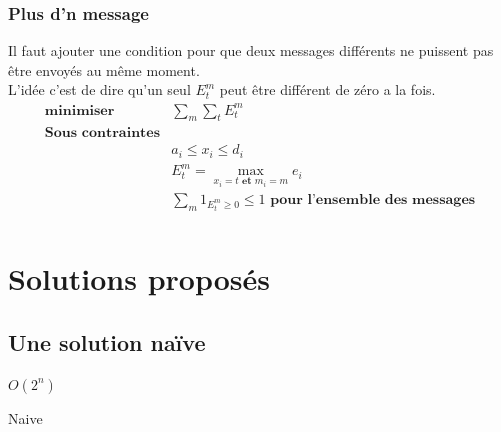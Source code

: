 \documentclass[runningheads]{llncs}
\begin{document}
\subsubsection{Plus d'n message}
Il faut ajouter une condition pour que deux messages différents ne puissent pas être envoy\'es au même moment.\\
L'idée c'est de dire qu'un seul $E_t^m$ peut être différent de zéro a la fois.
\[
    \begin{array}{cc}
         \textbf{minimiser} &  \sum \limits_{m}\sum\limits_{t} E_t^m\\
         \textbf{Sous contraintes} & \\
         & a_i \leq x_i \leq d_i\\
         & E_t^m = \max\limits_{x_i=t \textbf{ et } m_i=m} e_i \\
         & \sum\limits_{m}  1_{ E_t^m\geq 0} \leq 1 \textbf{ pour l'ensemble des messages} \\
    \end{array}
\]

\section{Solutions propos\'es }
\subsection{Une solution na\"ive }
$O(2^n)$ 
\begin{algorithm}[H]
    \caption{Naive}%
    \label{alg:naive}
    \begin{algorithmic}[1]
        \EndFor{}
        
    
    \end{algorithmic}
\end{algorithm}


  
\end{document}
